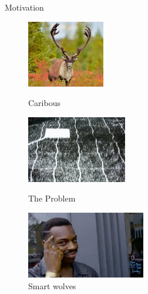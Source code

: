 \documentclass[aspectratio=43]{beamer}
\begin{document}
\begin{frame}{Motivation}
	\begin{figure}[h]	
		\includegraphics[width=\linewidth , height=110]{img/caribou.jpg}
		\caption{Caribous}
		\endminipage\hfill
		\includegraphics[width=\linewidth , height=110]{img/seismic_lines.jpg}
		\caption{The Problem}
		\endminipage\hfill
		\includegraphics[width=\linewidth , height=110]{img/smart_wolves.jpeg}
		\caption{Smart wolves}
		\endminipage\hfill
	\end{figure}
\end{frame}
\end{document}
